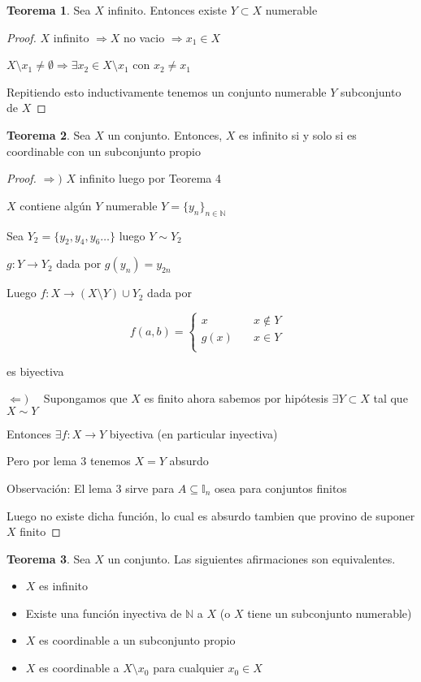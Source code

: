 \documentclass[12pt]{article}
\newcommand{\I}{\mathbb{I}}
\newcommand{\N}{\mathbb{N}}
\newcommand{\Ra}{\Rightarrow}
\newcommand{\ra}{\rightarrow}
\theoremstyle{definition}
\newtheorem{theorem}{Teorema}
\begin{document}
\begin{theorem}
  Sea $X$ infinito. Entonces existe $Y \subset X$ numerable

  \begin{proof}
    $X$ infinito $\Ra X$ no vacio $\Ra x_{1} \in X$

    $X \setminus {x_{1}} \neq \emptyset \Ra \exists x_{2} \in X \setminus {x_{1}}$ con $x_{2} \neq x_{1}$
  
Repitiendo esto inductivamente tenemos un conjunto numerable $Y$ subconjunto de $X$

  \end{proof}

\end{theorem}
\begin{theorem}
  Sea $X$ un conjunto. Entonces, $X$ es infinito si y solo si es coordinable con un subconjunto propio
  \begin{proof}
$\Ra )$  $X$ infinito luego por Teorema 4 

$X$ contiene algún $Y$ numerable $Y=\{y_{n}\}_{n \in \N}$

Sea $Y_{2} = \{y_{2},y_{4},y_{6} \dots \}$ luego $Y \sim Y_{2}$

$g: Y \ra Y_{2}$ dada por $g(y_{n}) = y_{2n}$

Luego $f: X \ra (X \setminus Y) \cup Y_{2}$ dada por  

\[
f(a,b) =
     \begin{cases}
       \text{$x$} &\quad\text{$x \notin Y$ }\\
       \text{$g(x)$} &\quad\text{$x \in Y$} \\
     \end{cases}
\]

es biyectiva

$\Leftarrow ) \quad$ Supongamos que $X$ es finito ahora sabemos por hipótesis $\exists Y \subset X$ tal que $X \sim Y$ 

Entonces $\exists f:X \ra Y$ biyectiva (en particular inyectiva) 

Pero por lema 3 tenemos $X = Y$ absurdo 

Observación: El lema 3 sirve para $A \subseteq \I_{n}$ osea para conjuntos finitos

Luego no existe dicha función, lo cual es absurdo tambien que provino de suponer $X$ finito
\end{proof}
\end{theorem}

\begin{theorem}
  Sea $X$ un conjunto. Las siguientes afirmaciones son equivalentes.
  \begin{itemize}
    \item $X$ es infinito
    \item Existe una función inyectiva de $\N$ a $X$ (o $X$ tiene un subconjunto numerable)
    \item $X$ es coordinable a un subconjunto propio
    \item $X$ es coordinable a $X \setminus {x_{0}}$ para cualquier $x_{0} \in X$
  \end{itemize}
\end{theorem}
\end{document}
